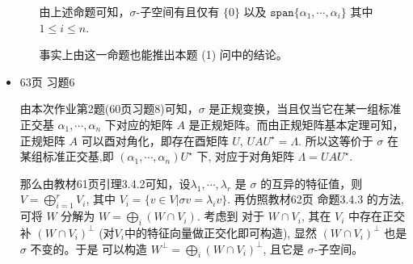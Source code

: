 \documentclass{article}
\begin{document}
\begin{spacing}{1.5}
\begin{itemize}
\begin{itemize}
        由上述命题可知，$\sigma$-子空间有且仅有 $\{0\}$ 以及 $\mathtt{span}\{\alpha_1,\cdots,\alpha_i\}$ 其中 $1\leq i\leq n$.

        事实上由这一命题也能推出本题 (1) 问中的结论。
    \end{itemize}
    
    \item [5.] 63页 习题6
    
    由本次作业第2题(60页习题8)可知，$\sigma$ 是正规变换，当且仅当它在某一组标准正交基 $\alpha_1, \cdots, \alpha_n$ 下对应的矩阵 $A$ 是正规矩阵。而由正规矩阵基本定理可知，正规矩阵 $A$ 可以酉对角化，即存在酉矩阵 $U$, $UAU^\star = \Lambda$. 所以这等价于 $\sigma$ 在某组标准正交基,即 $(\alpha_1, \cdots, \alpha_n)U^\star$ 下, 对应于对角矩阵 $\Lambda = UAU^\star$.

    那么由教材61页引理3.4.2可知，设$\lambda_1, \cdots, \lambda_r$ 是 $\sigma$ 的互异的特征值，则 $V = \bigoplus_{i=1}^r V_i$, 其中 $V_i = \{v\in V| \sigma v = \lambda_i v\}$. 再仿照教材62页 命题3.4.3 的方法, 可将 $W$ 分解为 $W = \bigoplus_i (W\cap V_i)$. 考虑到 对于 $W\cap V_i$, 其在 $V_i$ 中存在正交补 $(W\cap V_i)^\perp$ (对$V_i$中的特征向量做正交化即可构造), 显然 $(W\cap V_i)^\perp$ 也是 $\sigma$ 不变的。于是 可以构造 $W^\perp = \bigoplus_i (W\cap V_i)^\perp$, 且它是 $\sigma$-子空间。

\end{itemize}
\end{spacing}
\end{document}
